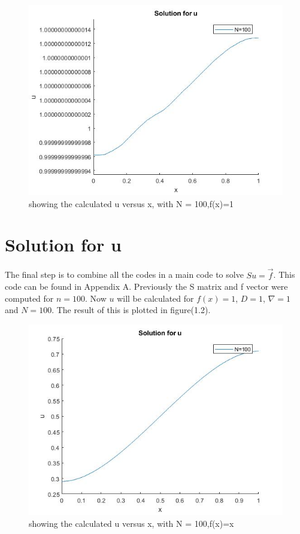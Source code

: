 \documentclass[a4paper]{report}
\begin{document}
\begin{figure}[ht!]
	\centering
	\includegraphics[width=150mm]{1Df1.jpg}
	\caption{showing the calculated u versus x, with N = 100,f(x)=1 \label{overflow}}
\end{figure}

\section{Solution for u}
The final step is to combine all the codes in a main code to solve $Su= \vec{f}$. This code can be found in Appendix A. Previously the S matrix and f vector were computed for $n = 100$. Now $u$ will be calculated for $f(x)=1$, $D=1$, $\nabla = 1$ and $N = 100$. The result of this is plotted in figure(1.2). 


\begin{figure}[ht!]
	\centering
	\includegraphics[width=150mm]{1Dfx.jpg}
	\caption{showing the calculated u versus x, with N = 100,f(x)=x 		 \label{overflow}}
\end{figure}
\end{document}

